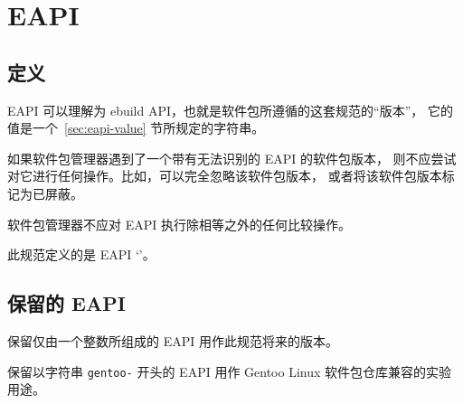 \chapter{EAPI}

\section{定义}
\label{sec:defined-eapi}
EAPI 可以理解为 ebuild API，也就是软件包所遵循的这套规范的“版本”，
它的值是一个~\ref{sec:eapi-value} 节所规定的字符串。

如果软件包管理器遇到了一个带有无法识别的 EAPI 的软件包版本，
则不应尝试对它进行任何操作。比如，可以完全忽略该软件包版本，
或者将该软件包版本标记为已屏蔽。

软件包管理器不应对 EAPI 执行除相等之外的任何比较操作。

此规范定义的是 EAPI ‘\TheCurrentEAPI ’。

\section{保留的 EAPI}

\begin{compactitem}
\item 保留仅由一个整数所组成的 EAPI 用作此规范将来的版本。
\item 保留以字符串 \texttt{gentoo-} 开头的 EAPI 用作
    Gentoo Linux 软件包仓库兼容的实验用途。
\end{compactitem}


